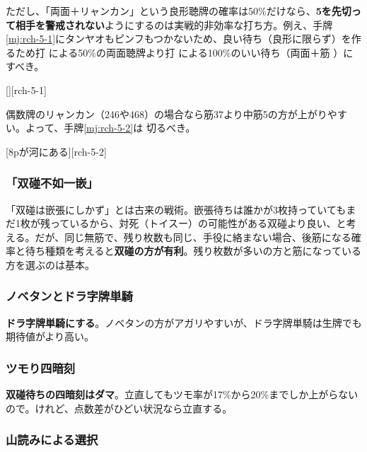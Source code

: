 \documentclass[10pt, twocolumn]{article}
\begin{document}
ただし、「両面＋リャンカン」という良形聴牌の確率は50\%だけなら、\textbf{5を先切って相手を警戒されない}ようにするのは実戦的非効率な打ち方\citep[][pp. 23--25]{ishibashi-black}。例え、手牌\ref{mj:rch-5-1}にタンヤオもピンフもつかないため、良い待ち（良形に限らず）を作るため打  による50\%の両面聴牌より打  による100\%のいい待ち（両面＋筋 ）にすべき。

[][rch-5-1]

偶数牌のリャンカン（246や468）の場合なら筋37より中筋5の方が上がりやすい。よって、手牌\ref{mj:rch-5-2}は  切るべき。

[8pが河にある][rch-5-2]

\subsubsection*{「双碰不如一嵌」} 

「双碰は嵌張にしかず」とは古来の戦術。嵌張待ちは誰かが3枚持っていてもまだ1枚が残っているから、対死（トイスー）の可能性がある双碰より良い、と考える。だが、同じ無筋で、残り枚数も同じ、手役に絡まない場合、後筋になる確率と待ち種類を考えると\textbf{双碰の方が有利}\citep{tsukemai}。残り枚数が多いの方と筋になっている方を選ぶのは基本。

\subsubsection*{ノベタンとドラ字牌単騎} 

\textbf{ドラ字牌単騎にする}\citep[][pp.~75--76]{miinin-choice}。ノベタンの方がアガリやすいが、ドラ字牌単騎は生牌でも期待値がより高い。

\subsubsection*{ツモり四暗刻}

\textbf{双碰待ちの四暗刻はダマ}\citep[][pp.~179--180]{miinin-choice}。立直してもツモ率が17\%から20\%までしか上がらないので。けれど、点数差がひどい状況なら立直する。

\subsubsection*{山読みによる選択}

\begin{rittai}[h]
  \centering
  
  
  \caption{Mリーグ2020 1/2 第2回戦 南2局 0本場（ツモ切り暗転なし）\citep[][p.~57]{muhai}}
  \label{rittai:20200102}
\end{rittai}
\end{document}
